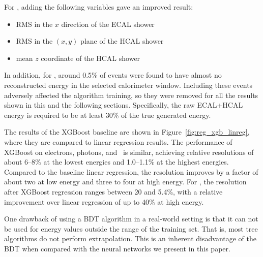 For \chpi, adding the following variables gave an improved result:
\begin{itemize}
\item RMS in the $x$ direction of the ECAL shower
\item RMS in the $(x,y)$ plane of the HCAL shower
\item mean $z$ coordinate of the HCAL shower
\end{itemize}

In addition, for \chpi, around 0.5\% of events were found to have almost no reconstructed energy in the selected calorimeter window.  Including these events adversely affected the algorithm training, so they were removed for all the results shown in this and the following sections. Specifically, the raw ECAL+HCAL energy is required to be at least 30\% of the true generated energy.

The results of the XGBoost baseline are shown in Figure~\ref{fig:reg_xgb_linreg}, where they are compared to linear regression results.
The performance of XGBoost on electrons, photons, and \pizero\ is similar, achieving relative resolutions of about 6--8\% at the lowest energies and 1.0--1.1\% at the highest energies.  Compared to the baseline linear regression, the resolution improves by a factor of about two at low energy and three to four at high energy.  For \chpi, the resolution after XGBoost regression ranges between 20 and 5.4\%, with a relative improvement over linear regression of up to 40\% at high energy.


One drawback of using a BDT algorithm in a real-world setting is that it can not be used for energy values outside the range of the training set. That is, most tree algorithms do not perform extrapolation. This is an inherent disadvantage of the BDT when compared with the neural networks we present in this paper.

